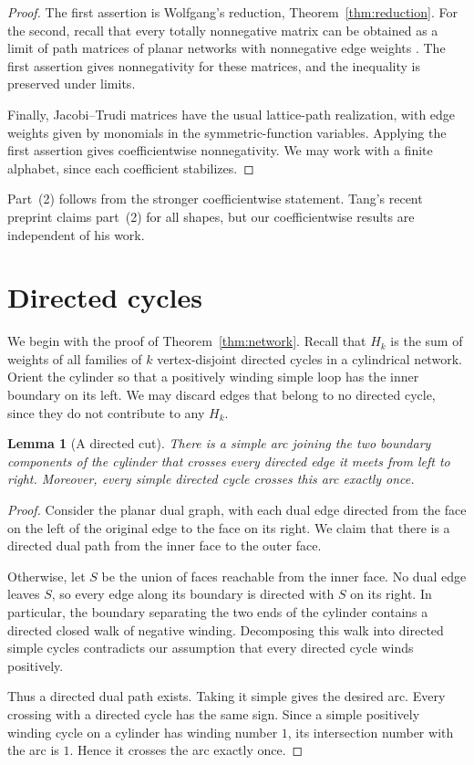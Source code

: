 \documentclass[11pt]{article}
\newtheorem{lemma}[theorem]{Lemma}
\theoremstyle{definition}
\theoremstyle{remark}
\begin{document}
\begin{proof}
The first assertion is Wolfgang's reduction,
Theorem~\ref{thm:reduction}. For the second,
recall that every totally nonnegative matrix
can be obtained as a limit of path matrices
of planar networks with nonnegative edge weights
\cite{Brenti95}. The first assertion gives
nonnegativity for these matrices, and the
inequality is preserved under limits.

Finally, Jacobi--Trudi matrices have the usual
lattice-path realization, with edge weights
given by monomials in the symmetric-function
variables. Applying the first assertion gives
coefficientwise nonnegativity. We may work
with a finite alphabet, since each coefficient
stabilizes.
\end{proof}


Part~(2) follows from the stronger coefficientwise
statement. Tang's recent preprint
\cite[Theorem~1.1]{Tang} claims part~(2) for
all shapes, but our coefficientwise results
are independent of his work.


\section{Directed cycles}\label{sec:networks}



We begin with the proof of Theorem~\ref{thm:network}.
Recall that $H_k$ is the sum of weights of all
families of $k$ vertex-disjoint directed cycles
in a cylindrical network. Orient the cylinder
so that a positively winding simple loop has
the inner boundary on its left. We may discard
edges that belong to no directed cycle, since
they do not contribute to any $H_k$.


\begin{lemma}[A directed cut]\label{lem:cut}
There is a simple arc joining the two boundary
components of the cylinder that crosses every
directed edge it meets from left to right.
Moreover, every simple directed cycle crosses
this arc exactly once.
\end{lemma}

\begin{proof}
Consider the planar dual graph, with each dual
edge directed from the face on the left of the
original edge to the face on its right.
We claim that there is a directed dual path
from the inner face to the outer face.

Otherwise, let $S$ be the union of faces
reachable from the inner face. No dual edge
leaves $S$, so every edge along its boundary
is directed with $S$ on its right. In particular,
the boundary separating the two ends of the
cylinder contains a directed closed walk of
negative winding. Decomposing this walk into
directed simple cycles contradicts our assumption
that every directed cycle winds positively.

Thus a directed dual path exists. Taking it
simple gives the desired arc. Every crossing
with a directed cycle has the same sign.
Since a simple positively winding cycle on
a cylinder has winding number $1$, its
intersection number with the arc is $1$.
Hence it crosses the arc exactly once.
\end{proof}
\end{document}
